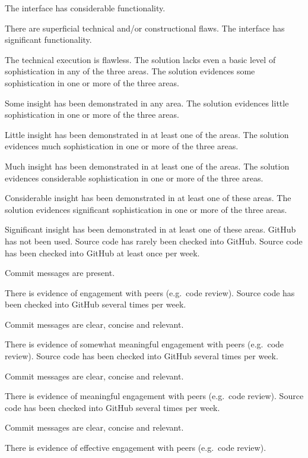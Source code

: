 \documentclass{../../fal_assignment}
\begin{document}
\begin{markingrubric}
        \grade The interface has considerable functionality.
            \par There are superficial technical and/or constructional flaws.
        \grade The interface has significant functionality.
            \par The technical execution is flawless.
%
        \grade\fail The solution lacks even a basic level of sophistication in any of the three areas.
        \grade The solution evidences some sophistication in one or more of the three areas.
            \par Some insight has been demonstrated in any area.
        \grade The solution evidences little sophistication in one or more of the three areas.
            \par Little insight has been demonstrated in at least one of the areas.
        \grade The solution evidences much sophistication in one or more of the three areas.
            \par Much insight has been demonstrated in at least one of the areas.
        \grade The solution evidences considerable sophistication in one or more of the three areas.
            \par Considerable insight has been demonstrated in at least one of these areas.
        \grade The solution evidences significant sophistication in one or more of the three areas.
            \par Significant insight has been demonstrated in at least one of these areas.
%            
        \grade\fail GitHub has not been used.
        \grade Source code has rarely been checked into GitHub.
        \grade Source code  has been checked into GitHub at least once per week.
            \par Commit messages are present.
            \par There is evidence of engagement with peers (e.g.\ code review).
        \grade Source code  has been checked into GitHub several times per week.
            \par Commit messages are clear, concise and relevant.
            \par There is evidence of somewhat meaningful engagement with peers (e.g.\ code review).
        \grade Source code has been checked into GitHub several times per week.
            \par Commit messages are clear, concise and relevant.
            \par There is evidence of meaningful engagement with peers (e.g.\ code review).
        \grade Source code has been checked into GitHub several times per week.
            \par Commit messages are clear, concise and relevant.
            \par There is evidence of effective engagement with peers (e.g.\ code review).
%
\end{markingrubric}
\end{document}
